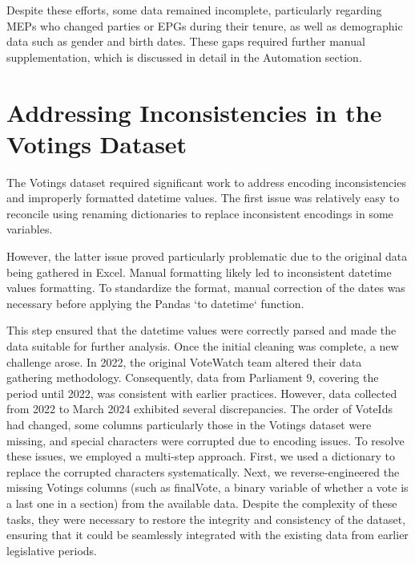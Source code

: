 \documentclass{report}
\begin{document}
            Despite these efforts, some data remained incomplete, particularly regarding MEPs who changed parties or
            EPGs during
            their tenure, as well as demographic data such as gender and birth dates. These gaps required further manual
            supplementation, which is discussed in detail in the Automation section.


        \section{Addressing Inconsistencies in the Votings Dataset}

            The Votings dataset required significant work to address encoding inconsistencies and improperly formatted
            datetime
            values. The first issue was relatively easy to reconcile using renaming dictionaries to replace inconsistent
            encodings in some variables.

            However, the latter issue proved particularly problematic due to the original data being gathered in Excel.
            Manual
            formatting likely led to inconsistent datetime values formatting. To standardize the format, manual
            correction of
            the dates was necessary before applying the Pandas `to datetime` function.

            This step ensured that the datetime values were correctly parsed and made the data suitable for further
            analysis.
            Once the initial cleaning was complete, a new challenge arose. In 2022, the original VoteWatch team altered
            their
            data gathering methodology. Consequently, data from Parliament 9, covering the period until 2022, was
            consistent
            with earlier practices. However, data collected from 2022 to March 2024 exhibited several discrepancies. The
            order
            of VoteIds had changed, some columns particularly those in the Votings dataset were missing, and special
            characters
            were corrupted due to encoding issues.
            To resolve these issues, we employed a multi-step approach. First, we used a dictionary to replace the
            corrupted
            characters systematically. Next, we reverse-engineered the missing Votings columns (such as finalVote, a
            binary
            variable of whether a vote is a last one in a section) from the available data. Despite the complexity of
            these
            tasks, they were necessary to restore the integrity and consistency of the dataset, ensuring that it could
            be
            seamlessly integrated with the existing data from earlier legislative periods.
\end{document}
